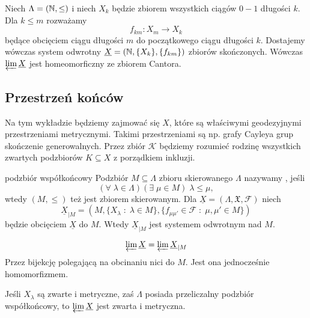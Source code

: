 \begin{example}{}{}
  Niech $\Lambda=(\mathbb{N}, \leq)$ i niech $X_k$ będzie zbiorem wszystkich ciągów $0-1$ długości $k$. Dla $k\leq m$ rozważamy 
  $$f_{km}:X_m\to X_k$$
  będące obcięciem ciągu długości $m$ do początkowego ciągu długości $k$. Dostajemy wówczas system odwrotny $\underline{X}=(\mathbb{N}, \{X_k\}, \{f_{km}\})$ zbiorów skończonych. Wówczas $\varprojlim\underline{X}$ jest homeomorficzny ze zbiorem Cantora.
\end{example}

\subsection{Przestrzeń końców}

Na tym wykładzie będziemy zajmować się $X$, które są właściwymi geodezyjnymi przestrzeniami metrycznymi. Takimi przestrzeniami są np. grafy Cayleya grup skończenie generowalnych. Przez zbiór $\mathcal{K}$ będziemy rozumieć rodzinę wszystkich zwartych podzbiorów $K\subseteq X$ z porządkiem inkluzji.


\begin{definition}{podzbiór współkońcowy}{}
  Podzbiór $M\subseteq\Lambda$ zbioru skierowanego $\Lambda$ nazywamy , jeśli 
  $$(\forall\;\lambda\in\Lambda)(\exists\;\mu\in M)\;\lambda\leq\mu,$$ 
  wtedy $(M, \leq)$ też jest zbiorem skierowanym. Dla $\underline{X}=(\Lambda, \mathfrak{X}, \mathcal{F})$ niech 
  $$\underline{X}_{|M}=(M, \{X_\lambda\;:\;\lambda\in M\}, \{f_{\mu\mu'}\in\mathcal{F}\;:\;\mu,\mu'\in M\})$$
  będzie obcięciem $\underline{X}$ do $M$. Wtedy $\underline{X}_{|M}$ jest systemem odwrotnym nad $M$.
\end{definition}

\begin{fact}{}{}
  $$\varprojlim\underline{X}=\varprojlim\underline{X}_{|M}$$
  Przez bijekcję polegającą na obcinaniu nici do $M$. Jest ona jednocześnie homomorfizmem.
\end{fact}

\begin{conclusion}{}{} 
  Jeśli $X_\lambda$ są zwarte i metryczne, zaś $\Lambda$ posiada przeliczalny podzbiór współkońcowy, to $\varprojlim\underline{X}$ jest zwarta i metryczna.
\end{conclusion}

